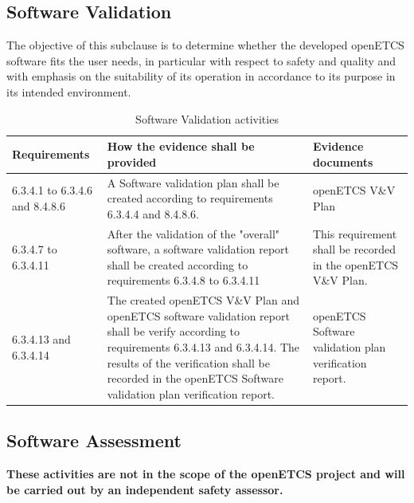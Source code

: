 \documentclass{template/openetcs_report}
\begin{document}
\subsection{Software Validation}
\begin{flushleft}
The objective of this subclause is to determine whether the developed openETCS software fits the user needs, in particular with respect to safety and quality and with emphasis on the suitability of its operation in accordance to its purpose in its intended environment.
\end{flushleft}
{\footnotesize\sffamily\centering
\begin{longtable}{|p{2cm}|p{9cm}|p{3cm}|}
\caption{Software Validation activities}\\
\hline
\bfseries Requirements & \bfseries How the evidence shall be provided & \bfseries Evidence documents\\
\hline
\hline
\endhead
\hline
\endfoot

6.3.4.1 to 6.3.4.6 and 8.4.8.6 & A Software validation plan shall be created according to requirements 6.3.4.4 and 8.4.8.6.
& openETCS V\&V Plan \\ 
\hline
6.3.4.7 to 6.3.4.11 & After the validation of the "overall" software, a software validation report shall be created according to requirements 6.3.4.8 to 6.3.4.11
& This requirement shall be recorded in the openETCS V\&V Plan.\\ 
\hline
6.3.4.13 and 6.3.4.14 & The created openETCS V\&V Plan and openETCS software validation report shall be verify according to requirements 6.3.4.13 and 6.3.4.14. 
The results of the verification shall be recorded in the openETCS Software validation plan verification report. & openETCS Software validation plan verification report.\\ 
\hline
\end{longtable}}


\subsection{Software Assessment}
\textbf{These activities are not in the scope of the openETCS project and will be carried out by an independent safety assessor.}
\end{document}
